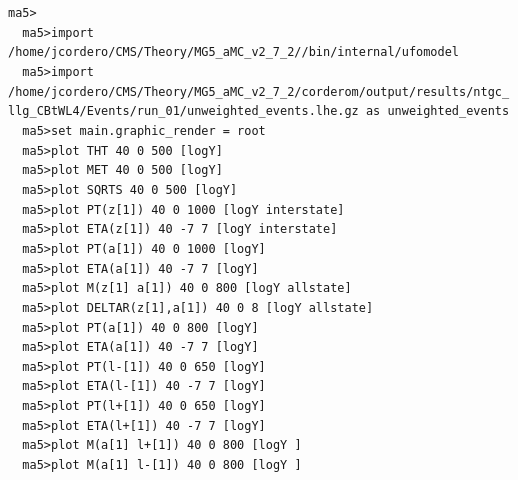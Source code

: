 \documentclass[a4paper, 10pt]{article}
\begin{document}
\texttt{ma5>\\
}
\texttt{ }\texttt{ }\texttt{ma5>import /\-home/\-jcordero/\-CMS/\-Theory/\-MG5\_aMC\_v2\_7\_2/\-/\-bin/\-internal/\-ufomodel\\
}
\texttt{ }\texttt{ }\texttt{ma5>import /\-home/\-jcordero/\-CMS/\-Theory/\-MG5\_aMC\_v2\_7\_2/\-corderom/\-output/\-results/\-ntgc\_llg\_CBtWL4/\-Events/\-run\_01/\-unweighted\_events.lhe.gz as unweighted\_events\\
}
\texttt{ }\texttt{ }\texttt{ma5>set main.graphic\_render = root\\
}
\texttt{ }\texttt{ }\texttt{ma5>plot THT                 40 0 500 [logY]\\
}
\texttt{ }\texttt{ }\texttt{ma5>plot MET                 40 0 500 [logY]\\
}
\texttt{ }\texttt{ }\texttt{ma5>plot SQRTS               40 0 500 [logY]\\
}
\texttt{ }\texttt{ }\texttt{ma5>plot PT(z[1])            40 0 1000 [logY interstate]\\
}
\texttt{ }\texttt{ }\texttt{ma5>plot ETA(z[1])           40 -7 7 [logY interstate]\\
}
\texttt{ }\texttt{ }\texttt{ma5>plot PT(a[1])            40 0 1000 [logY]\\
}
\texttt{ }\texttt{ }\texttt{ma5>plot ETA(a[1])           40 -7 7 [logY]\\
}
\texttt{ }\texttt{ }\texttt{ma5>plot M(z[1] a[1])        40 0 800 [logY allstate]\\
}
\texttt{ }\texttt{ }\texttt{ma5>plot DELTAR(z[1],a[1])   40 0 8 [logY allstate]\\
}
\texttt{ }\texttt{ }\texttt{ma5>plot PT(a[1])            40 0 800 [logY]\\
}
\texttt{ }\texttt{ }\texttt{ma5>plot ETA(a[1])           40 -7 7 [logY]\\
}
\texttt{ }\texttt{ }\texttt{ma5>plot PT(l-[1])           40 0 650 [logY]\\
}
\texttt{ }\texttt{ }\texttt{ma5>plot ETA(l-[1])          40 -7 7 [logY]\\
}
\texttt{ }\texttt{ }\texttt{ma5>plot PT(l+[1])           40 0 650 [logY]\\
}
\texttt{ }\texttt{ }\texttt{ma5>plot ETA(l+[1])          40 -7 7 [logY]\\
}
\texttt{ }\texttt{ }\texttt{ma5>plot M(a[1] l+[1])       40 0 800 [logY ]\\
}
\texttt{ }\texttt{ }\texttt{ma5>plot M(a[1] l-[1])       40 0 800 [logY ]\\
}
\end{document}
